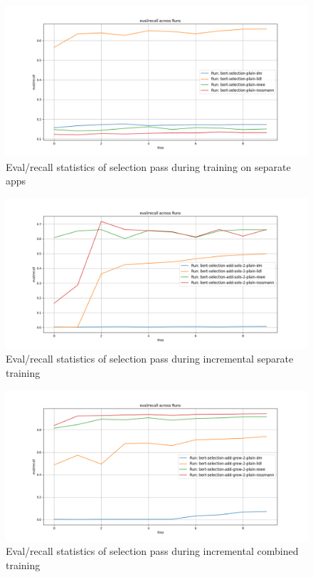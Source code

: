 \documentclass[licencjacka,en]{pracamgr}
\begin{document}
\begin{appendices}
\begin{figure}[ht]
    \centering
    \includegraphics[width=0.8\linewidth]{bachelor_images/bert_ft/s_ers.png}
    \caption{Eval/recall statistics of selection pass during training on separate apps}
    \label{fig:s_ers}
\end{figure}

\begin{figure}[ht]
    \centering
    \includegraphics[width=0.8\linewidth]{bachelor_images/bert_ft/s_eras.png}
    \caption{Eval/recall statistics of selection pass during incremental separate training}
    \label{fig:s_eras}
\end{figure}

\begin{figure}[ht]
    \centering
    \includegraphics[width=0.8\linewidth]{bachelor_images/bert_ft/s_erag.png}
    \caption{Eval/recall statistics of selection pass during incremental combined training}
    \label{fig:s_erag}
\end{figure}


\end{appendices}
\end{document}
